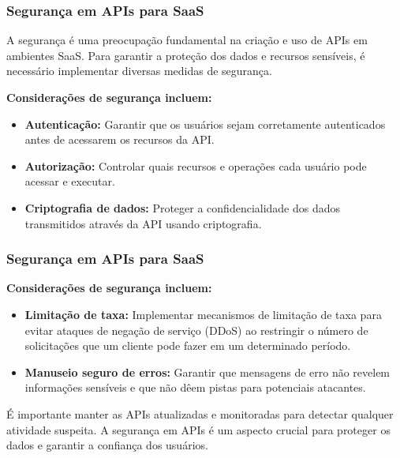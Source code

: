 \documentclass{beamer}
\begin{document}
\begin{frame}
	\frametitle{Segurança em APIs para SaaS}

	A segurança é uma preocupação fundamental na criação e uso de APIs em ambientes SaaS. Para garantir a proteção dos dados e recursos sensíveis, é necessário implementar diversas medidas de segurança.

	\textbf{Considerações de segurança incluem:}
	\begin{itemize}
		\item \textbf{Autenticação:} Garantir que os usuários sejam corretamente autenticados antes de acessarem os recursos da API.
		\item \textbf{Autorização:} Controlar quais recursos e operações cada usuário pode acessar e executar.
		\item \textbf{Criptografia de dados:} Proteger a confidencialidade dos dados transmitidos através da API usando criptografia.
	\end{itemize}

\end{frame}
\begin{frame}
	\frametitle{Segurança em APIs para SaaS}

	\textbf{Considerações de segurança incluem:}
	\begin{itemize}
		\item \textbf{Limitação de taxa:} Implementar mecanismos de limitação de taxa para evitar ataques de negação de serviço (DDoS) ao restringir o número de solicitações que um cliente pode fazer em um determinado período.
		\item \textbf{Manuseio seguro de erros:} Garantir que mensagens de erro não revelem informações sensíveis e que não dêem pistas para potenciais atacantes.
	\end{itemize}

	É importante manter as APIs atualizadas e monitoradas para detectar qualquer atividade suspeita. A segurança em APIs é um aspecto crucial para proteger os dados e garantir a confiança dos usuários.

\end{frame}
\end{document}
